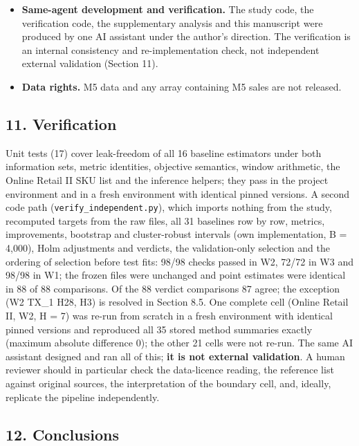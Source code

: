 \documentclass[
]{article}
\begin{document}
\begin{itemize}
  \emph{inconclusive}, which is conservative for H3 (one W2 cell, two W3
  cells); the supplementary check shows the verdict counts do not change
  when Monte-Carlo error is removed.
\item
  \textbf{Same-agent development and verification.} The study code, the
  verification code, the supplementary analysis and this manuscript were
  produced by one AI assistant under the author's direction. The
  verification is an internal consistency and re-implementation check,
  not independent external validation (Section 11).
\item
  \textbf{Data rights.} M5 data and any array containing M5 sales are
  not released.
\end{itemize}

\subsection{11. Verification}\label{verification}

Unit tests (17) cover leak-freedom of all 16 baseline estimators under
both information sets, metric identities, objective semantics, window
arithmetic, the Online Retail II SKU list and the inference helpers;
they pass in the project environment and in a fresh environment with
identical pinned versions. A second code path
(\texttt{verify\_independent.py}), which imports nothing from the study,
recomputed targets from the raw files, all 31 baselines row by row,
metrics, improvements, bootstrap and cluster-robust intervals (own
implementation, B = 4,000), Holm adjustments and verdicts, the
validation-only selection and the ordering of selection before test
fits: 98/98 checks passed in W2, 72/72 in W3 and 98/98 in W1; the frozen
files were unchanged and point estimates were identical in 88 of 88
comparisons. Of the 88 verdict comparisons 87 agree; the exception (W2
TX\_1 H28, H3) is resolved in Section 8.5. One complete cell (Online
Retail II, W2, H = 7) was re-run from scratch in a fresh environment
with identical pinned versions and reproduced all 35 stored method
summaries exactly (maximum absolute difference 0); the other 21 cells
were not re-run. The same AI assistant designed and ran all of this;
\textbf{it is not external validation}. A human reviewer should in
particular check the data-licence reading, the reference list against
original sources, the interpretation of the boundary cell, and, ideally,
replicate the pipeline independently.

\subsection{12. Conclusions}\label{conclusions}
\end{document}
